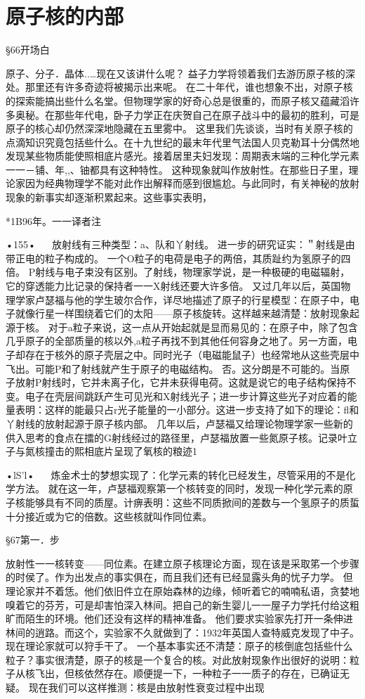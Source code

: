 \chapter{原子核的内部}

§66开场白

原子、分子．晶体..…现在又该讲什么呢？
益子力学将领着我们去游历原子核的深处。那里还有许多奇迹将被揭示出来呢。
在二十年代，谁也想象不出，对原子核的探索能搞出些什么名堂。但物理学家的好奇心总是很重的，而原子核又蕴藏滔许多奥秘。在那些年代电，卧子力学正在庆贺自己在原子战斗中的最初的胜利，可是原子的核心却仍然深深地隐藏在五里雾中。
这里我们先谈谈，当时有关原子核的点滴知识究竟包括些什么。在十九世纪的最末年代里气法国人贝克勒耳十分偶然地发现某些物质能使照相底片感光。接着居里夫妇发现：周期表末端的三种化学元素一一－铺、年,,、铀都具有这种特性。
这种现象就叫作放射性。在那些日子里，理论家因为经典物理学不能对此作出解释而感到很尴尬。与此同时，有关神秘的放射现象的新事实却逐渐积累起来。这些事实表明，

*1B96年。一一译者注

•155•
  
放射线有三种类型：a、队和丫射线。
进一步的研究证实：＂射线是由带正电的粒子构成的。
一个O粒子的电荷是电子的两倍，其质趾约为氢原子的四倍。
P射线与电子束没有区别。了射线，物理家学说，是一种极硬的电磁辐射，它的穿透能力比记录的保持者一一X射线还要大许多倍。
又过几年以后，英国物理学家卢瑟福与他的学生玻尔合作，详尽地描述了原子的行星模型：在原子中，电子就像行星一样围绕着它们的太阳——原子核旋转。这样越来越清楚：放射现象起源于核。
对于a粒子来说，这一点从开始起就是显而易见的：在原子中，除了包含几乎原子的全部质量的核以外,a粒子再找不到其他任何容身之地了。另一方面，电子却存在于核外的原子壳层之中。同时光子（电磁能鼠子）也经常地从这些壳层中飞出。可能P和了射线就产生于原子的电磁结构。
否。这分朗是不可能的。当原子放射P射线时，它并未离子化，它井未获得电荷。这就是说它的电子结构保持不变。电子在壳层间跳跃产生可见光和X射线光子；进一步计算这些光子对应着的能量表明：这样的能最只占r光子能量的一小部分。这进一步支持了如下的理论：fl和丫射线的放射起源于原子核内部。
几年以后，卢瑟福又给理论物理学家一些新的供入思考的食点在擂的G射线经过的路径里，卢瑟福放置一些氮原子核。记录叶立子与氮核撞击的熙相底片呈现了氧核的粮迹1

•lS'l•
  
炼金术士的梦想实现了：化学元素的转化已经发生，尽管采用的不是化学方法。
就在这一年，卢瑟福观察第一个核转变的同时，发现一种化学元素的原子核能够具有不同的质屋。计痹表明：这些不同质掀间的差数与一个氢原子的质蜇十分接近或为它的倍数。这些核就叫作同位素。

§67第一．步

放射性一一核转变——同位素。在建立原子核理论方面，现在该是采取笫一个步骤的时侯了。作为出发点的事实俱在，而且我们还有已经显露头角的忧子力学。
但理论家并不着恁。他们依旧件立在原始森林的边缘，倾听着它的喃喃私语，贪婪地嗅着它的芬芳，可是却害怕深入林间。把自己的新生婴儿一一屋子力学托付给这粗旷而陌生的环境。他们还没有这样的精神准备。
他们要求实验家先打开一条伸进林间的逍路。而这个，实验家不久就做到了：1932年英国人查特威克发现了中子。现在理论家就可以狩手干了。
一个基本事实还不清楚：原子的核倒底包括些什么粒子？事实很清楚，原子的核是一个复合的核。对此放射现象作出很好的说明：粒子从核飞出，但核依然存在。顺便提一下，一种粒子一一质子的存在，已确证无疑。
现在我们可以这样推测：核是由放射性衰变过程中出现

